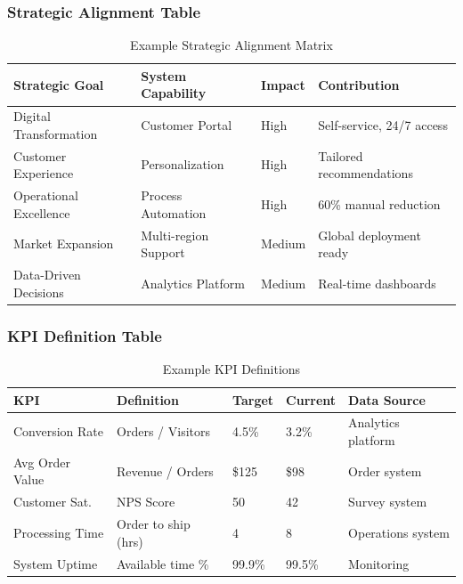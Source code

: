 \documentclass[11pt,letterpaper]{article}
\begin{document}
\subsubsection{Strategic Alignment Table}

\begin{table}[H]
\centering
\caption{Example Strategic Alignment Matrix}
\small
\begin{tabular}{@{}L{3.5cm}L{3cm}C{1.5cm}L{4cm}@{}}
\toprule
\textbf{Strategic Goal} & \textbf{System Capability} & \textbf{Impact} & \textbf{Contribution} \\
\midrule
Digital Transformation & Customer Portal & High & Self-service, 24/7 access \\
\addlinespace
Customer Experience & Personalization & High & Tailored recommendations \\
\addlinespace
Operational Excellence & Process Automation & High & 60\% manual reduction \\
\addlinespace
Market Expansion & Multi-region Support & Medium & Global deployment ready \\
\addlinespace
Data-Driven Decisions & Analytics Platform & Medium & Real-time dashboards \\
\bottomrule
\end{tabular}
\end{table}

\subsubsection{KPI Definition Table}

\begin{table}[H]
\centering
\caption{Example KPI Definitions}
\small
\begin{tabular}{@{}L{2.5cm}L{3cm}C{1.5cm}C{1.5cm}L{3cm}@{}}
\toprule
\textbf{KPI} & \textbf{Definition} & \textbf{Target} & \textbf{Current} & \textbf{Data Source} \\
\midrule
Conversion Rate & Orders / Visitors & 4.5\% & 3.2\% & Analytics platform \\
\addlinespace
Avg Order Value & Revenue / Orders & \$125 & \$98 & Order system \\
\addlinespace
Customer Sat. & NPS Score & 50 & 42 & Survey system \\
\addlinespace
Processing Time & Order to ship (hrs) & 4 & 8 & Operations system \\
\addlinespace
System Uptime & Available time \% & 99.9\% & 99.5\% & Monitoring \\
\bottomrule
\end{tabular}
\end{table}
\end{document}
